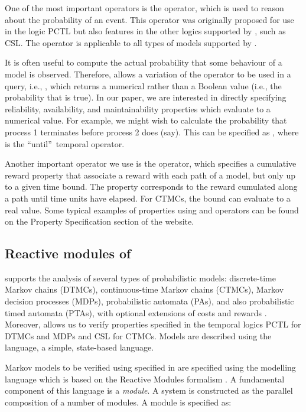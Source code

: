 \documentclass[preprint,12pt]{qrei}
\begin{document}
One of the most important operators is the  operator, which is used to reason about the probability of an event. This operator was originally proposed for use in the logic PCTL but also features in the other logics supported by , such as CSL. The  operator is applicable to all types of models supported by .

It is often useful to compute the actual probability that some behaviour of a model is observed. Therefore,  allows a variation of the  operator to be used in a query, i.e., , which returns a numerical rather than a Boolean value (i.e., the probability that  is true). In our paper, we are interested in directly specifying reliability, availability, and maintainability properties which evaluate to a numerical value. For example, we might wish to calculate the probability that process 1 terminates before process 2 does (say). This can be specified as , where  is the \textquotedblleft until\textquotedblright\ temporal operator.

Another important operator we use is the  operator, which specifies a cumulative reward property that associate a reward with each path of a model, but only up to a given time bound. The property   corresponds to the reward cumulated along a path until  time units have elapsed. For CTMCs, the bound  can evaluate to a real value. Some typical examples of properties using  and  operators can be found on the Property Specification section of the  website.


\subsection{Reactive modules of }

 supports the analysis of several types of probabilistic models: discrete-time Markov chains (DTMCs), continuous-time Markov chains (CTMCs), Markov decision processes (MDPs), probabilistic automata (PAs), and also probabilistic timed automata (PTAs), with optional extensions of costs and rewards \cite{KNP09}. Moreover,  allows us to verify properties specified in the temporal logics PCTL for DTMCs and MDPs and CSL for CTMCs. Models are described using the  language, a simple, state-based language.

Markov models to be verified using specified in  are specified using the  modelling language which is based on the Reactive Modules formalism \cite{AH99}. A fundamental component of this language is a {\it module}. A system is constructed as the parallel composition of a number of modules. A module is specified as:
\end{document}
